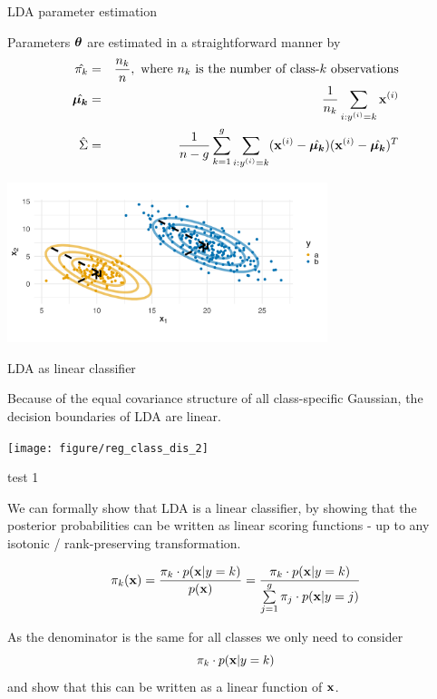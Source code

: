 \documentclass[11pt,compress,t,notes=noshow, xcolor=table]{beamer}
\begin{document}
\begin{vbframe}{LDA parameter estimation}
  
Parameters $\thetav$ are estimated in a straightforward manner by
\begin{eqnarray*}
\hat{\pik} &=& \frac{n_k}{n},\text{ where $n_k$ is the number of class-$k$ observations} \\
\hat{\muk} &=& \frac{1}{n_k}\sum_{i: \yi = k} \xi \\
\hat{\Sigma} &=& \frac{1}{n - g} \sumkg \sum_{i: \yi = k} (\xi - \hat{\muk}) (\xi - \hat{\muk}) ^T
\end{eqnarray*}

\vspace{-0.9em}
\begin{center}
\includegraphics[width=0.70\textwidth, clip=true, trim={0 75 0 45}]{figure/disc_analysis-lda_2.png}
\end{center}

\end{vbframe}

\begin{vbframe}{LDA as linear classifier}

  Because of the equal covariance structure of all class-specific Gaussian, the decision boundaries
  of LDA are linear.

\begin{knitrout}\scriptsize
{}\color{fgcolor}

{\centering \texttt{[image: figure/reg\_class\_dis\_2]} 

}



\end{knitrout}

\end{vbframe}

\begin{vbframe}{test 1}

We can formally show that LDA is a linear classifier, by showing that the posterior probabilities
can be written as linear scoring functions - up to any isotonic / rank-preserving transformation.

$$
  \pikx = \frac{\pik \cdot \pdfxyk }{\pdfx} = \frac{\pik \cdot \pdfxyk}{\sumjg \pi_j \cdot \pdfxyk[j]}
$$

As the denominator is the same for all classes we only need to consider 
$$\pik \cdot \pdfxyk$$ 
and show that this can be written as a linear function of $\xv$.
  
\end{vbframe}
\end{document}
